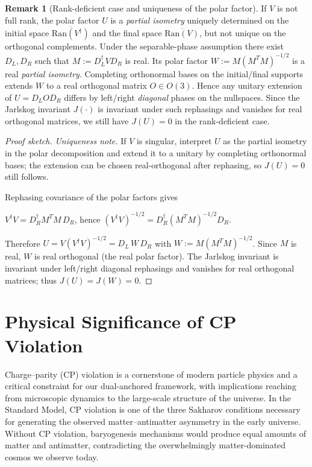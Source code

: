 \documentclass[11pt]{article}
\theoremstyle{plain}
\theoremstyle{definition}
\newtheorem{remark}[theorem]{Remark}
\begin{document}
\begin{remark}[Rank-deficient case and uniqueness of the polar factor]
  If $V$ is not full rank, the polar factor $U$ is a \emph{partial isometry} uniquely determined on the initial space $\overline{\mathrm{Ran}(V^\dagger)}$ and the final space $\overline{\mathrm{Ran}(V)}$, but not unique on the orthogonal complements. Under the separable-phase assumption there exist $D_L,D_R$ such that $M:=D_L^\dagger V D_R$ is real. Its polar factor $W:=M(M^T M)^{-1/2}$ is a real \emph{partial isometry}. Completing orthonormal bases on the initial/final supports extends $W$ to a real orthogonal matrix $O\in O(3)$. Hence any unitary extension of $U=D_L O D_R$ differs by left/right \emph{diagonal} phases on the nullspaces. Since the Jarlskog invariant $J(\cdot)$ is invariant under such rephasings and vanishes for real orthogonal matrices, we still have $J(U)=0$ in the rank-deficient case.
\end{remark}

\begin{proof}[Proof sketch]

  \noindent\emph{Uniqueness note.} If $V$ is singular, interpret $U$ as the partial isometry in the polar decomposition and extend it to a unitary by completing orthonormal bases; the extension can be chosen real-orthogonal after rephasing, so $J(U)=0$ still follows.

  Rephasing covariance of the polar factors gives

  $V^\dagger V = D_R^\dagger M^T M\, D_R$, hence $(V^\dagger V)^{-1/2} = D_R^\dagger (M^T M)^{-1/2} D_R$.

  Therefore $U=V(V^\dagger V)^{-1/2}=D_L\,W\,D_R$ with $W:=M(M^T M)^{-1/2}$.
  Since $M$ is real, $W$ is real orthogonal (the real polar factor). The Jarlskog invariant is invariant under left/right diagonal rephasings and vanishes for real orthogonal matrices; thus $J(U)=J(W)=0$.
\end{proof}

\section{Physical Significance of CP Violation}

Charge–parity (CP) violation is a cornerstone of modern particle physics and a critical constraint for our dual-anchored framework, with implications reaching from microscopic dynamics to the large-scale structure of the universe. In the Standard Model, CP violation is one of the three Sakharov conditions necessary for generating the observed matter–antimatter asymmetry in the early universe. Without CP violation, baryogenesis mechanisms would produce equal amounts of matter and antimatter, contradicting the overwhelmingly matter-dominated cosmos we observe today.
\end{document}
